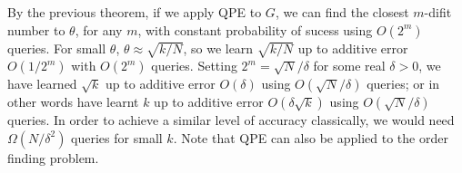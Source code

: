 By the previous theorem, if we apply QPE to $G$, we can find the closest $m$-difit number to $\theta$, for any $m$, with constant probability of sucess using $O(2^m)$ queries. For small $\theta$, $\theta \approx \sqrt{k/N}$, so we learn $\sqrt{k/N}$ up to additive error $O(1/2^m)$ with $O(2^m)$ queries. Setting $2^m = \sqrt{N}/\delta$ for some real $\delta > 0$, we have learned $\sqrt{k}$ up to additive error $O(\delta)$ using $O(\sqrt{N}/\delta)$ queries; or in other words have learnt $k$ up to additive error $O(\delta\sqrt{k})$ using $O(\sqrt{N}/\delta)$ queries. In order to achieve a similar level of accuracy classically, we would need $\Omega(N/\delta^2)$ queries for small $k$. Note that QPE can also be applied to the order finding problem.
